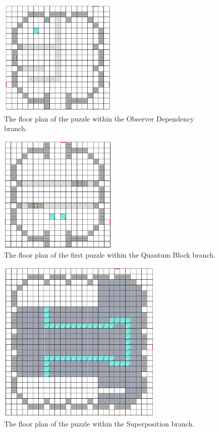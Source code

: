 \documentclass[11pt,twoside]{report} %
\begin{document}
\begin{figure}[h!]
\centering
\includegraphics[width=0.5\textwidth]{odb-puzzle}
\caption{The floor plan of the puzzle within the Observer Dependency branch.}
\label{fig:odb-puzzle}
\end{figure}

\begin{figure}[h!]
\centering
\includegraphics[width=0.5\textwidth]{qb-puzzle}
\caption{The floor plan of the first puzzle within the Quantum Block branch.}
\label{fig:qb-puzzle}
\end{figure}

\begin{figure}[h!]
\centering
\includegraphics[width=0.7\textwidth]{sp-puzzle}
\caption{The floor plan of the puzzle within the Superposition branch.}
\label{fig:sp-puzzle}
\end{figure}
\end{document}
